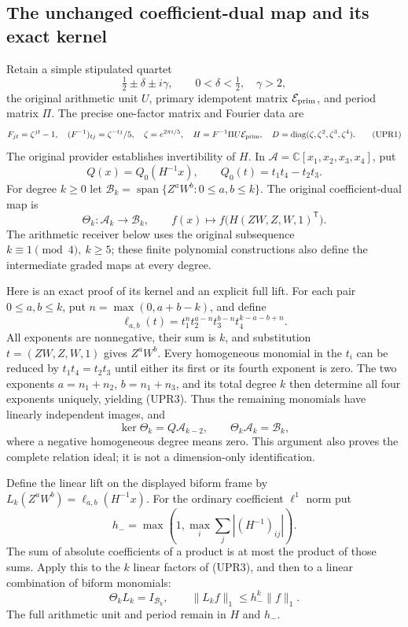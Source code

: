 \documentclass[11pt,a4paper]{article}
\begin{document}
\subsection{The unchanged coefficient-dual map and its exact kernel}
Retain a simple stipulated quartet
\[
\tfrac12\pm\delta\pm i\gamma,\qquad
0<\delta<\tfrac12,\quad\gamma>2,
\]
the original arithmetic unit \(U\), primary idempotent matrix
\(\mathcal E_{\rm prim}\), and period matrix \(\Pi\).  The precise
one-factor matrix and Fourier data are
\[
F_{jt}=\zeta^{jt}-1,\quad
(F^{-1})_{tj}=\zeta^{-tj}/5,\quad
\zeta=e^{2\pi i/5},\quad
H=F^{-1}\Pi U\mathcal E_{\rm prim},\quad
D=\operatorname{diag}(\zeta,\zeta^2,\zeta^3,\zeta^4).
\tag{UPR1}
\]
The original provider establishes invertibility of \(H\).  In
\(\mathcal A=\mathbb C[x_1,x_2,x_3,x_4]\), put
\[
Q(x)=Q_0(H^{-1}x),\qquad Q_0(t)=t_1t_4-t_2t_3.
\]
For degree \(k\ge0\) let
\(\mathcal B_k=\operatorname{span}\{Z^aW^b:0\le a,b\le k\}\).
The original coefficient-dual map is
\[
\Theta_k:\mathcal A_k\longrightarrow\mathcal B_k,\qquad
f(x)\longmapsto f\bigl(H(ZW,Z,W,1)^{\mathsf T}\bigr).
\tag{UPR2}
\]
The arithmetic receiver below uses the original subsequence
\(k\equiv1\pmod4,\ k\ge5\); these finite polynomial constructions
also define the intermediate graded maps at every degree.

Here is an exact proof of its kernel and an explicit full lift.
For each pair \(0\le a,b\le k\), put \(n=\max(0,a+b-k)\), and define
\[
\ell_{a,b}(t)=
t_1^nt_2^{a-n}t_3^{b-n}t_4^{k-a-b+n}.
\tag{UPR3}
\]
All exponents are nonnegative, their sum is \(k\), and substitution
\(t=(ZW,Z,W,1)\) gives \(Z^aW^b\).  Every homogeneous monomial in
the \(t_i\) can be reduced by \(t_1t_4=t_2t_3\) until either its
first or its fourth exponent is zero.  The two exponents
\(a=n_1+n_2\), \(b=n_1+n_3\), and its total degree \(k\) then
determine all four exponents uniquely, yielding (UPR3).
Thus the remaining monomials have linearly independent images, and
\[
\ker\Theta_k=Q\mathcal A_{k-2},\qquad
\Theta_k\mathcal A_k=\mathcal B_k,
\tag{UPR4}
\]
where a negative homogeneous degree means zero.  This argument
also proves the complete relation ideal; it is not a dimension-only
identification.

Define the linear lift on the displayed biform frame by
\(L_k(Z^aW^b)=\ell_{a,b}(H^{-1}x)\).
For the ordinary coefficient \(\ell^1\) norm put
\[
h_-=\max\left(1,\max_i\sum_j|(H^{-1})_{ij}|\right).
\]
The sum of absolute coefficients of a product is at most the
product of those sums.  Apply this to the \(k\) linear factors of
(UPR3), and then to a linear combination of biform monomials:
\[
\Theta_kL_k=I_{\mathcal B_k},\qquad
\|L_kf\|_1\le h_-^k\|f\|_1.
\tag{UPR5}
\]
The full arithmetic unit and period remain in \(H\) and \(h_-\).
\end{document}
